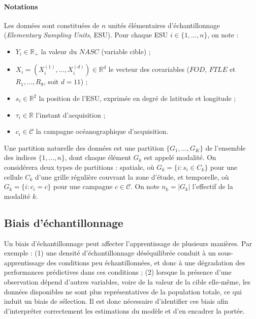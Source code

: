 	\paragraph{Notations}
		Les données sont constituées de $n$ unités élémentaires d'échantillonnage (\textit{Elementary Sampling Units}, ESU). Pour chaque ESU $i \in \{1, \dots, n\}$, on note :
		\begin{itemize}
			\item $Y_i \in \mathbb{R}_+$ la valeur du $NASC$ (variable cible) ;
			\item $X_i = (X_i^{(1)}, \dots, X_i^{(d)}) \in \mathbb{R}^d$ le vecteur des covariables ($FOD$, $FTLE$ et $R_1, \dots, R_9$, soit $d = 11$) ;
			\item $s_i \in \mathbb{R}^2$ la position de l'ESU, exprimée en degré de latitude et longitude ;
			\item $\tau_i \in \mathbb{R}$ l'instant d'acquisition ;
			\item $c_i \in \mathcal{C}$ la campagne océanographique d'acquisition.
		\end{itemize}
		Une partition naturelle des données est une partition $\{G_1, \dots, G_K\}$ de l'ensemble des indices $\{1, \dots, n\}$, dont chaque élément $G_k$ est appelé modalité. On considérera deux types de partitions : spatiale, où $G_k = \{i : s_i \in C_k\}$ pour une cellule $C_k$ d'une grille régulière couvrant la zone d'étude, et temporelle, où $G_k = \{i : c_i = c\}$ pour une campagne $c \in \mathcal{C}$. On note $n_k = |G_k|$ l'effectif de la modalité $k$.
	
	\subsection{Biais d'échantillonnage}
		Un biais d'échantillonnage peut affecter l'apprentissage de plusieurs manières. Par exemple : (1) une densité d'échantillonnage déséquilibrée conduit à un sous-apprentissage des conditions peu échantillonnées, et donc à une dégradation des performances prédictives dans ces conditions ; (2) lorsque la présence d'une observation dépend d'autres variables, voire de la valeur de la cible elle-même, les données disponibles ne sont plus représentatives de la population totale, ce qui induit un biais de sélection. Il est donc nécessaire d'identifier ces biais afin d'interpréter correctement les estimations du modèle et d'en encadrer la portée.
		
